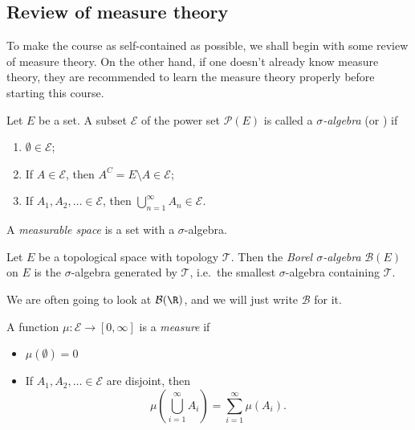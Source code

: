 \documentclass[a4paper]{article}
\begin{document}
\subsection{Review of measure theory}
To make the course as self-contained as possible, we shall begin with some review of measure theory. On the other hand, if one doesn't already know measure theory, they are recommended to learn the measure theory properly before starting this course.

\begin{defi}
  Let $E$ be a set. A subset $\mathcal{E}$ of the power set $\mathcal{P}(E)$ is called a \emph{$\sigma$-algebra} (or ) if
  \begin{enumerate}
    \item $\emptyset \in \mathcal{E}$;
    \item If $A \in \mathcal{E}$, then $A^C = E \setminus A \in \mathcal{E}$;
    \item If $A_1, A_2, \ldots \in \mathcal{E}$, then $\bigcup_{n = 1}^\infty A_n \in \mathcal{E}$.
  \end{enumerate}
\end{defi}

\begin{defi}
  A \emph{measurable space} is a set with a $\sigma$-algebra.
\end{defi}


\begin{defi}
  Let $E$ be a topological space with topology $\mathcal{T}$. Then the \emph{Borel $\sigma$-algebra} $\mathcal{B}(E)$ on $E$ is the $\sigma$-algebra generated by $\mathcal{T}$, i.e.\ the smallest $\sigma$-algebra containing $\mathcal{T}$.
\end{defi}

We are often going to look at $\mathcal{B}(\R)$, and we will just write $\mathcal{B}$ for it.

\begin{defi}[Measure]
  A function $\mu: \mathcal{E} \to [0, \infty]$ is a \emph{measure} if
  \begin{itemize}
    \item $\mu(\emptyset) = 0$
    \item If $A_1, A_2, \ldots \in \mathcal{E}$ are disjoint, then
      \[
        \mu \left(\bigcup_{i = 1}^\infty A_i \right) = \sum_{i = 1}^\infty \mu(A_i).
      \]
  \end{itemize}
\end{defi}
\end{document}
